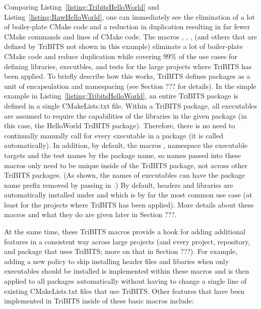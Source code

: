 \documentclass[note]{TechNote}
\begin{document}
Comparing Listing~\ref{listing:TribitsHelloWorld} and Listing~\ref{listing:RawHelloWorld}, one can immediately see the elimination of a lot of boiler-plate CMake code and a reduction in duplication resulting in far fewer CMake commands and lines of CMake code.  The macros , , ,  (and others that are defined by TriBITS not shown in this example) eliminate a lot of boiler-plate CMake code and reduce duplication while covering 99\% of the use cases for defining libraries, executbles, and tests for the large projects where TriBITS has been applied.  To briefly describe how this works, TriBITS defines packages as a unit of encapsulation and namespacing (see Section ??? for details).  In the simple example in Listing~\ref{listing:TribitsHelloWorld}, an entire TriBITS package is defined in a single CMakeLists.txt file.  Within a TriBITS package, all executables are assumed to require the capabilities of the libraries in the given package (in this case, the HelloWorld TriBITS package).  Therefore, there is no need to continually manually call  for every executable in a package (it is called automatically).  In addition, by default, the macros ,  namespace the executable targets and the test names by the package name, so names passed into these macros only need to be unique inside of the TriBITS package, not across other TriBITS packages.  (As shown, the names of executables can have the package name prefix removed by passing in .)  By default, headers and libraries are automatically installed under  and  which is by far the most common use case (at least for the projects where TriBITS has been applied).  More details about these macros and what they do are given later in Section ???.

At the same time, these TriBITS macros provide a hook for adding additional features in a consistent way across large projects (and every project, repository, and package that uses TriBITS; more on that in Section ???).  For example, adding a new policy to skip installing header files and libaries when only executables should be installed is implemented within these macros and is then applied to all packages automatically without having to change a single line of existing CMakeLists.txt files that use TriBITS.  Other features that have been implemented in TriBITS inside of these basic macros include:
\end{document}

